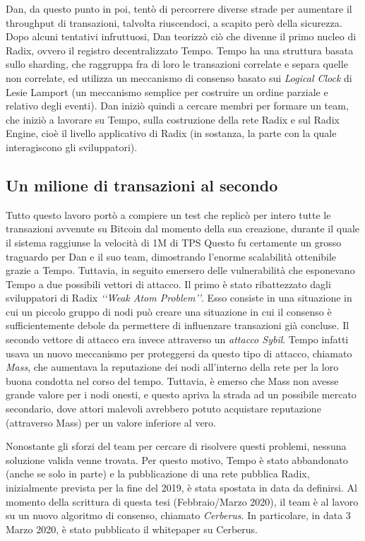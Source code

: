 Dan, da questo punto in poi, tentò di percorrere diverse strade per aumentare il throughput di transazioni, talvolta riuscendoci, a scapito però della sicurezza. Dopo alcuni tentativi infruttuosi, Dan teorizzò ciò che divenne il primo nucleo di Radix, ovvero il registro decentralizzato Tempo. Tempo ha una struttura basata sullo sharding, che raggruppa fra di loro le transazioni correlate e separa quelle non correlate, ed utilizza un meccanismo di consenso basato sui \textit{Logical Clock} di Lesie Lamport (un meccanismo semplice per costruire un ordine parziale e relativo degli eventi). Dan iniziò quindi a cercare membri per formare un team, che iniziò a lavorare su Tempo, sulla costruzione della rete Radix e sul Radix Engine, cioè il livello applicativo di Radix (in sostanza, la parte con la quale interagiscono gli sviluppatori). 

\subsection{Un milione di transazioni al secondo}

Tutto questo lavoro portò a compiere un test che replicò per intero tutte le transazioni avvenute su Bitcoin dal momento della sua creazione, durante il quale il sistema raggiunse la velocità di 1M di TPS Questo fu certamente un grosso traguardo per Dan e il suo team, dimostrando l'enorme scalabilità ottenibile grazie a Tempo. Tuttavia, in seguito emersero delle vulnerabilità che esponevano Tempo a due possibili vettori di attacco. Il primo è stato ribattezzato dagli sviluppatori di Radix \textit{‘‘Weak Atom Problem’’}. Esso consiste in una situazione in cui un piccolo gruppo di nodi può creare una situazione in cui il consenso è sufficientemente debole da permettere di influenzare transazioni già concluse. Il secondo vettore di attacco era invece attraverso un \textit{attacco Sybil}. Tempo infatti usava un nuovo meccanismo per proteggersi da questo tipo di attacco, chiamato \textit{Mass}, che aumentava la reputazione dei nodi all'interno della rete per la loro buona condotta nel corso del tempo. Tuttavia, è emerso che Mass non avesse grande valore per i nodi onesti, e questo apriva la strada ad un possibile mercato secondario, dove attori malevoli avrebbero potuto acquistare reputazione  (attraverso Mass) per un valore inferiore al vero.

Nonostante gli sforzi del team per cercare di risolvere questi problemi, nessuna soluzione valida venne trovata. Per questo motivo, Tempo è stato abbandonato (anche se solo in parte) e la pubblicazione di una rete pubblica Radix, inizialmente prevista per la fine del 2019, è stata spostata in data da definirsi. Al momento della scrittura di questa tesi (Febbraio/Marzo 2020), il team è al lavoro su un nuovo algoritmo di consenso, chiamato \textit{Cerberus}. In particolare, in data 3 Marzo 2020, è stato pubblicato il whitepaper su Cerberus. 

